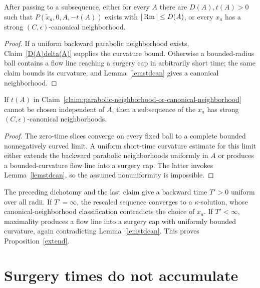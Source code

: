 \begin{claim}
\label{claim:parabolic-neighborhood-or-canonical-neighborhood}
After passing to a subsequence, either for every $A$ there are $D(A),t(A)>0$
such that $P(\widetilde x_a,0,A,-t(A))$ exists with $|\operatorname{Rm}|\leq D(A)$, or every
$x_a$ has a strong $(C,\epsilon)$-canonical neighborhood.
\end{claim}

\begin{proof}
\sketch
{}
If a uniform backward parabolic neighborhood exists, Claim~\ref{D(A)delta(A)}
supplies the curvature bound. Otherwise a bounded-radius ball contains a flow
line reaching a surgery cap in arbitrarily short time; the same claim bounds its
curvature, and Lemma~\ref{lemstdcan} gives a canonical neighborhood.
\end{proof}

\begin{claim}
\label{claim:uniform-t-prime-independent-of-A}
If $t(A)$ in Claim~\ref{claim:parabolic-neighborhood-or-canonical-neighborhood}
cannot be chosen independent of $A$, then a subsequence of the $x_a$ has
strong $(C,\epsilon)$-canonical neighborhoods.
\end{claim}

\begin{proof}
\sketch
{}
The zero-time slices converge on every fixed ball to a complete bounded
nonnegatively curved limit. A uniform short-time curvature estimate for this
limit either extends the backward parabolic neighborhoods uniformly in $A$ or
produces a bounded-curvature flow line into a surgery cap. The latter invokes
Lemma~\ref{lemstdcan}, so the assumed nonuniformity is impossible.
\end{proof}

The preceding dichotomy and the last claim give a backward time $T'>0$ uniform
over all radii. If $T'=\infty$, the rescaled sequence converges to a
$\kappa$-solution, whose canonical-neighborhood classification contradicts the
choice of $x_a$. If $T'<\infty$, maximality produces a flow line into a surgery
cap with uniformly bounded curvature, again contradicting
Lemma~\ref{lemstdcan}. This proves Proposition~\ref{extend}.

\section{Surgery times do not accumulate}
\label{sectcomplete}

